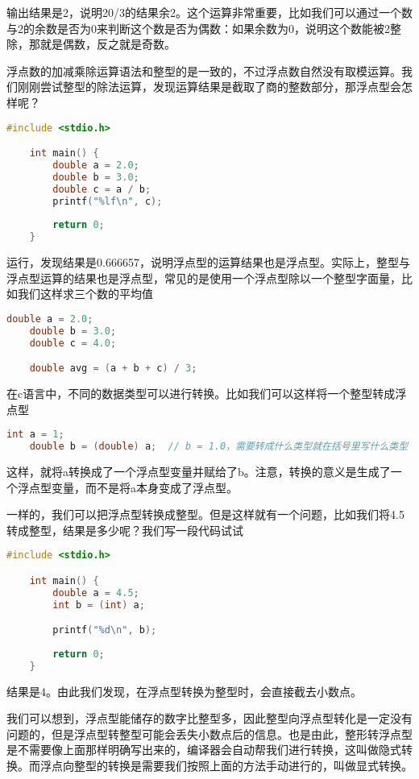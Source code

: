 输出结果是2，说明20/3的结果余2。这个运算非常重要，比如我们可以通过一个数与2的余数是否为0来判断这个数是否为偶数：如果余数为0，说明这个数能被2整除，那就是偶数，反之就是奇数。

浮点数的加减乘除运算语法和整型的是一致的，不过浮点数自然没有取模运算。我们刚刚尝试整型的除法运算，发现运算结果是截取了商的整数部分，那浮点型会怎样呢？

\begin{lstlisting}[language=C]
    #include <stdio.h>

    int main() {
        double a = 2.0;
        double b = 3.0;
        double c = a / b;
        printf("%lf\n", c);
        
        return 0;
    }
\end{lstlisting}

运行，发现结果是0.666657，说明浮点型的运算结果也是浮点型。实际上，整型与浮点型运算的结果也是浮点型，常见的是使用一个浮点型除以一个整型字面量，比如我们这样求三个数的平均值

\begin{lstlisting}[language=C]
    double a = 2.0;
    double b = 3.0;
    double c = 4.0;

    double avg = (a + b + c) / 3;
\end{lstlisting}

在c语言中，不同的数据类型可以进行转换。比如我们可以这样将一个整型转成浮点型

\begin{lstlisting}[language=C]
    int a = 1;
    double b = (double) a;  // b = 1.0，需要转成什么类型就在括号里写什么类型
\end{lstlisting}

这样，就将a转换成了一个浮点型变量并赋给了b。注意，转换的意义是生成了一个浮点型变量，而不是将a本身变成了浮点型。

一样的，我们可以把浮点型转换成整型。但是这样就有一个问题，比如我们将4.5转成整型，结果是多少呢？我们写一段代码试试

\begin{lstlisting}[language=C]
    #include <stdio.h>

    int main() {
        double a = 4.5;
        int b = (int) a;

        printf("%d\n", b);
        
        return 0;
    }
\end{lstlisting}

结果是4。由此我们发现，在浮点型转换为整型时，会直接截去小数点。

我们可以想到，浮点型能储存的数字比整型多，因此整型向浮点型转化是一定没有问题的，但是浮点型转整型可能会丢失小数点后的信息。也是由此，整形转浮点型是不需要像上面那样明确写出来的，编译器会自动帮我们进行转换，这叫做隐式转换。而浮点向整型的转换是需要我们按照上面的方法手动进行的，叫做显式转换。

